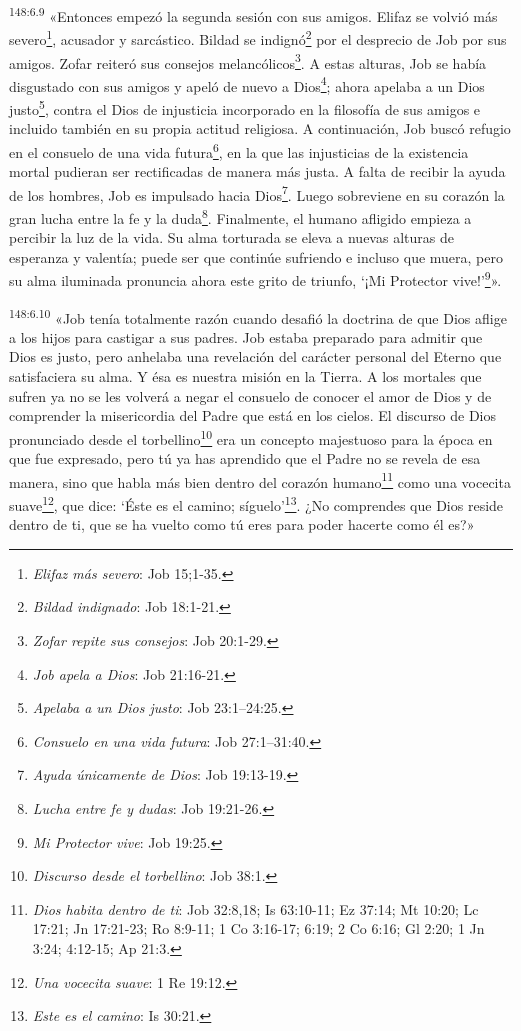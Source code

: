 \par
\textsuperscript{148:6.9} «Entonces empezó la segunda sesión con sus amigos. Elifaz se volvió más severo\footnote{\textit{Elifaz más severo}: Job 15;1-35.}, acusador y sarcástico. Bildad se indignó\footnote{\textit{Bildad indignado}: Job 18:1-21.} por el desprecio de Job por sus amigos. Zofar reiteró sus consejos melancólicos\footnote{\textit{Zofar repite sus consejos}: Job 20:1-29.}. A estas alturas, Job se había disgustado con sus amigos y apeló de nuevo a Dios\footnote{\textit{Job apela a Dios}: Job 21:16-21.}; ahora apelaba a un Dios justo\footnote{\textit{Apelaba a un Dios justo}: Job 23:1--24:25.}, contra el Dios de injusticia incorporado en la filosofía de sus amigos e incluido también en su propia actitud religiosa. A continuación, Job buscó refugio en el consuelo de una vida futura\footnote{\textit{Consuelo en una vida futura}: Job 27:1--31:40.}, en la que las injusticias de la existencia mortal pudieran ser rectificadas de manera más justa. A falta de recibir la ayuda de los hombres, Job es impulsado hacia Dios\footnote{\textit{Ayuda únicamente de Dios}: Job 19:13-19.}. Luego sobreviene en su corazón la gran lucha entre la fe y la duda\footnote{\textit{Lucha entre fe y dudas}: Job 19:21-26.}. Finalmente, el humano afligido empieza a percibir la luz de la vida. Su alma torturada se eleva a nuevas alturas de esperanza y valentía; puede ser que continúe sufriendo e incluso que muera, pero su alma iluminada pronuncia ahora este grito de triunfo, `¡Mi Protector vive!'\footnote{\textit{Mi Protector vive}: Job 19:25.}».

\par
\textsuperscript{148:6.10} «Job tenía totalmente razón cuando desafió la doctrina de que Dios aflige a los hijos para castigar a sus padres. Job estaba preparado para admitir que Dios es justo, pero anhelaba una revelación del carácter personal del Eterno que satisfaciera su alma. Y ésa es nuestra misión en la Tierra. A los mortales que sufren ya no se les volverá a negar el consuelo de conocer el amor de Dios y de comprender la misericordia del Padre que está en los cielos. El discurso de Dios pronunciado desde el torbellino\footnote{\textit{Discurso desde el torbellino}: Job 38:1.} era un concepto majestuoso para la época en que fue expresado, pero tú ya has aprendido que el Padre no se revela de esa manera, sino que habla más bien dentro del corazón humano\footnote{\textit{Dios habita dentro de ti}: Job 32:8,18; Is 63:10-11; Ez 37:14; Mt 10:20; Lc 17:21; Jn 17:21-23; Ro 8:9-11; 1 Co 3:16-17; 6:19; 2 Co 6:16; Gl 2:20; 1 Jn 3:24; 4:12-15; Ap 21:3.} como una vocecita suave\footnote{\textit{Una vocecita suave}: 1 Re 19:12.}, que dice: `Éste es el camino; síguelo'\footnote{\textit{Este es el camino}: Is 30:21.}. ¿No comprendes que Dios reside dentro de ti, que se ha vuelto como tú eres para poder hacerte como él es?»

